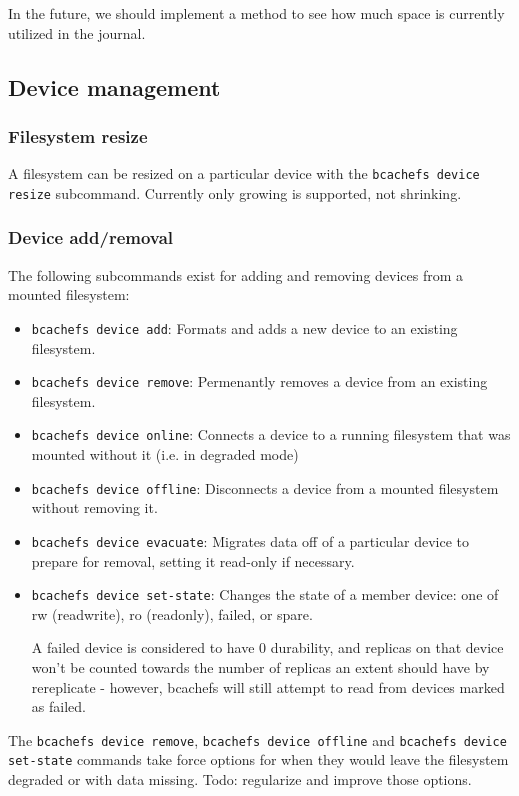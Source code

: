\documentclass{article}
\begin{document}
In the future, we should implement a method to see how much space is currently
utilized in the journal.

\subsection{Device management}

\subsubsection{Filesystem resize}

A filesystem can be resized on a particular device with the
\texttt{bcachefs device resize} subcommand. Currently only growing is supported,
not shrinking.

\subsubsection{Device add/removal}

The following subcommands exist for adding and removing devices from a mounted
filesystem:
\begin{itemize}
	\item \texttt{bcachefs device add}: Formats and adds a new device to an
		existing filesystem.
	\item \texttt{bcachefs device remove}: Permenantly removes a device from
		an existing filesystem.
	\item \texttt{bcachefs device online}: Connects a device to a running
		filesystem that was mounted without it (i.e. in degraded mode)
	\item \texttt{bcachefs device offline}: Disconnects a device from a
		mounted filesystem without removing it.
	\item \texttt{bcachefs device evacuate}: Migrates data off of a
		particular device to prepare for removal, setting it read-only
		if necessary.
	\item \texttt{bcachefs device set-state}: Changes the state of a member
		device: one of rw (readwrite), ro (readonly), failed, or spare.

		A failed device is considered to have 0 durability, and replicas
		on that device won't be counted towards the number of replicas
		an extent should have by rereplicate - however, bcachefs will
		still attempt to read from devices marked as failed.
\end{itemize}

The \texttt{bcachefs device remove}, \texttt{bcachefs device offline} and
\texttt{bcachefs device set-state} commands take force options for when they
would leave the filesystem degraded or with data missing. Todo: regularize and
improve those options.
\end{document}
